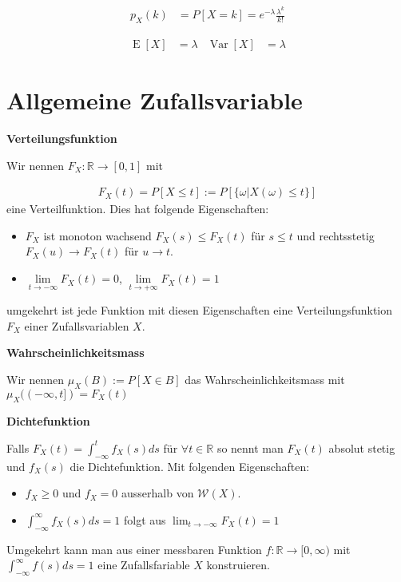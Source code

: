 \documentclass[25pt]{sciposter}
\newcommand{\R}{\mathbb{R}}
\newcommand{\W}{\mathcal{W}}
\newcommand{\Var}{\operatorname{Var}}
\newcommand{\E}{\operatorname{E}}
\newenvironment{method}[1]{\begin{mdframed}[backgroundcolor=blue!10,innertopmargin=15pt, innerbottommargin=15pt,nobreak=true]
		\textbf{#1 }
	}
	{ 
	\end{mdframed}
}
\begin{document}
\begin{multicols}{3}
\begin{align*}
	p_X(k) &= P[X = k] = e^{-\lambda} \frac{\lambda^k}{k!}
\end{align*}

\begin{align*}
\E[X] &= \lambda & \Var[X] &= \lambda
\end{align*}



\section*{Allgemeine Zufallsvariable}



\begin{method}{Verteilungsfunktion}
	Wir nennen $F_X : \R \to [0,1]$ mit 
	
	\begin{align*}
		F_X (t) = P[X\leq t]:= P[\{\omega | X(\omega) \leq t\}]
	\end{align*}
	eine Verteilfunktion. Dies hat folgende Eigenschaften:
	\begin{itemize}
		\item $F_X$ ist monoton wachsend $F_X(s)\leq F_X(t)$ für $s\leq t$ und rechtsstetig $F_X(u) \to F_X(t)$ für $u \to t$.
		\item $\lim\limits_{t\to-\infty} F_X(t) = 0$, $\lim\limits_{t\to + \infty} F_X(t) = 1$ 
	\end{itemize}
	umgekehrt ist jede Funktion mit diesen Eigenschaften eine Verteilungsfunktion $F_X$ einer Zufallsvariablen $X$.
\end{method}


\begin{method}{Wahrscheinlichkeitsmass}
	Wir nennen $\mu_X(B) := P[X \in B]$ das Wahrscheinlichkeitsmass mit $\mu_X((-\infty,t]) = F_X(t)$
\end{method}

\begin{method}{Dichtefunktion}
	Falls $F_X(t) = \int_{-\infty}^t f_X(s) ds$ für $\forall t\in\R$ so nennt man $F_X(t)$ absolut stetig und $f_X(s)$ die Dichtefunktion. Mit folgenden Eigenschaften:
	\begin{itemize}
		\item $f_X \geq 0$ und $f_X = 0$ ausserhalb von $\W(X)$.
		\item $\int_{-\infty}^\infty f_X(s) ds = 1$ folgt aus $\lim_{t \to -\infty}F_X(t) = 1$
	\end{itemize}

Umgekehrt kann man aus einer messbaren Funktion $f:\R\to[0,\infty)$ mit $\int_{-\infty}^\infty f(s)ds = 1$ eine Zufallsfariable $X$ konstruieren.
\end{method}



\end{multicols}
\end{document}
